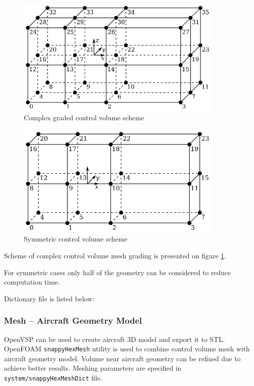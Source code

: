 \begin{figure} [h!]
  \centering
  \includegraphics[width=100mm]{eps/openfoam_control_volume_3_1.eps}
  \caption{Complex graded control volume scheme}
  \label{fig-cfd-mesh-complex-grading}
\end{figure}

\begin{figure} [h!]
  \centering
  \includegraphics[width=100mm]{eps/openfoam_control_volume_3_2.eps}
  \caption{Symmetric control volume scheme}
\end{figure}

Scheme of complex control volume mesh grading is presented on figure \ref{fig-cfd-mesh-complex-grading}.

For symmetric cases only half of the geometry can be considered to reduce computation time.

Dictionary file is listed below:
\begin{codelistdict}
  
\end{codelistdict}

\subsubsection{Mesh -- Aircraft Geometry Model}

OpenVSP can be used to create aircraft 3D model and export it to STL. OpenFOAM \texttt{snappyHexMesh} utility is used to combine control volume mesh with aircraft geometry model. Volume near aircraft geometry can be refined due to achieve better results. Meshing parameters are specified in \texttt{system/snappyHexMeshDict} file.

